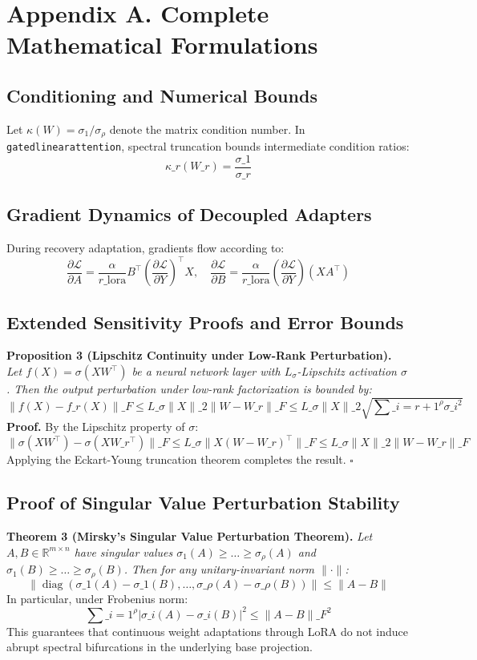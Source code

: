 \section*{Appendix A. Complete Mathematical Formulations}

\subsection*{Conditioning and Numerical Bounds}
Let $\kappa(W) = \sigma_1 / \sigma_\rho$ denote the matrix condition number. In \texttt{gatedlinearattention}, spectral truncation bounds intermediate condition ratios:
\[
\kappa\_r(W\_r) = \frac{\sigma\_1}{\sigma\_r}
\]

\subsection*{Gradient Dynamics of Decoupled Adapters}
During recovery adaptation, gradients flow according to:
\[
\frac{\partial \mathcal{L}}{\partial A} = \frac{\alpha}{r\_{\text{lora}}} B^\top \left( \frac{\partial \mathcal{L}}{\partial Y} \right)^\top X, \quad \frac{\partial \mathcal{L}}{\partial B} = \frac{\alpha}{r\_{\text{lora}}} \left( \frac{\partial \mathcal{L}}{\partial Y} \right) (X A^\top)
\]

\subsection*{Extended Sensitivity Proofs and Error Bounds}
\textbf{Proposition 3 (Lipschitz Continuity under Low-Rank Perturbation).} \textit{Let $f(X) = \sigma(X W^\top)$ be a neural network layer with $L_\sigma$-Lipschitz activation $\sigma$. Then the output perturbation under low-rank factorization is bounded by:}
\[
\|f(X) - f\_r(X)\|\_F \le L\_\sigma \|X\|\_2 \|W - W\_r\|\_F \le L\_\sigma \|X\|\_2 \sqrt{\sum\_{i=r+1}^\rho \sigma\_i^2}
\]
\textbf{Proof.} By the Lipschitz property of $\sigma$:
\[
\|\sigma(X W^\top) - \sigma(X W\_r^\top)\|\_F \le L\_\sigma \|X (W - W\_r)^\top\|\_F \le L\_\sigma \|X\|\_2 \|W - W\_r\|\_F
\]
Applying the Eckart-Young truncation theorem completes the result. $\square$

\subsection*{Proof of Singular Value Perturbation Stability}
\textbf{Theorem 3 (Mirsky's Singular Value Perturbation Theorem).} \textit{Let $A, B \in \mathbb{R}^{m \times n}$ have singular values $\sigma_1(A) \ge \dots \ge \sigma_\rho(A)$ and $\sigma_1(B) \ge \dots \ge \sigma_\rho(B)$. Then for any unitary-invariant norm $\|\cdot\|$:}
\[
\left\| \operatorname{diag}(\sigma\_1(A) - \sigma\_1(B), \dots, \sigma\_\rho(A) - \sigma\_\rho(B)) \right\| \le \|A - B\|
\]
In particular, under Frobenius norm:
\[
\sum\_{i=1}^\rho |\sigma\_i(A) - \sigma\_i(B)|^2 \le \|A - B\|\_F^2
\]
This guarantees that continuous weight adaptations through LoRA do not induce abrupt spectral bifurcations in the underlying base projection.

